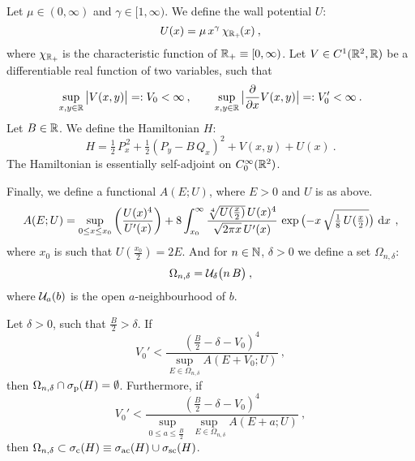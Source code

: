 \begin{defn}[Hamiltonian]
    Let $\mu \in (0, \infty)$ and $\gamma \in [1, \infty)$. We define the wall potential $U$:
    \begin{equation*}
        U(x) = \mu \, x^\gamma \, \chi_{\mathbb{R}_+\!}(x)
        \: ,
    \end{equation*}
    where $\chi_{\mathbb{R}_+\!}$ is the characteristic function of $\mathbb{R}_+ \equiv [0, \infty)$. Let $V \in C^1(\mathbb{R}^2, \mathbb{R})$ be a differentiable real function of two variables, such that
    \begin{equation*}
        \sup_{x,y \in \mathbb{R}} \big| V(x,y) \big| =: V_0 < \infty
        \: , \qquad
        \sup_{x,y \in \mathbb{R}} \big| \frac{\partial }{\partial x} V(x,y) \big| =: V_0' < \infty
        \: .
    \end{equation*}
    Let $B \in \mathbb{R}$. We define the Hamiltonian $H$:
    \begin{equation*}
        H
        = \tfrac{1}{2} \, P_x^{\,2}
        + \tfrac{1}{2}(P_y - B\, Q_x)^2
        + V(x, y)
        + U(x)
        \: .
    \end{equation*}
    The Hamiltonian is essentially self-adjoint on $C^\infty_0(\mathbb{R}^2)$.
\end{defn}
\begin{defn}[Auxiliary]
    Finally, we define a functional $A(E; U)$, where $E>0$ and $U$ is as above.
    \begin{equation*}
        A(E; U)
        = \sup_{0 \leq x \leq x_0}
        \left( \frac{U(x)^4}{U'(x)} \right)
        + 8 \int_{x_0}^\infty
        \frac{ \sqrt[4]{U(\tfrac{x}{2})} \, U(x)^4 }{ \sqrt{2\pi x} \, U'(x)}
        \, \exp \big( {-x} \, \sqrt{\tfrac{1}{8}\,U(\tfrac{x}{2})} \big)
        \, \, \mathrm{d}x \,
        \: ,
    \end{equation*}
    where $x_0$ is such that $U(\tfrac{x_0}{2}) = 2E$. And for $n \in \mathbb{N}$, $\delta>0$ we define a set $\Omega_{n,\delta}$:
    \begin{equation*}
        \Omega_{n, \delta} = \mathcal{U}_\delta\big( n \, B \big)
        \: ,
    \end{equation*}
    where $\mathcal{U}_a(b)$ is the open $a$-neighbourhood of $b$.
\end{defn}

\begin{thm}
    Let $\delta>0$, such that $\tfrac{B}{2} > \delta$. If
    \begin{equation*}
        V_0' < \frac{
            \left(\tfrac{B}{2} - \delta - V_0\right)^4
        }{
            \displaystyle \sup_{E \in \Omega_{n,\delta}}
            A(E+V_0; U)
        }
        \: ,
    \end{equation*}
    then $\Omega_{n,\delta} \cap \sigma_{\mathrm{p}}(H) = \emptyset$. Furthermore, if
    \begin{equation*}
        V_0' < \frac{
            \left(\tfrac{B}{2} - \delta - V_0\right)^4
        }{
            \displaystyle
            \sup_{0 \leq a \leq \tfrac{B}{2} \;}
            \sup_{\; E \in \Omega_{n,\delta}}
            A(E+a; U)
        }
        \: ,
    \end{equation*}
    then $\Omega_{n, \delta} \subset \sigma_{\mathrm{c}}(H) \equiv \sigma_{\mathrm{ac}}(H) \cup \sigma_{\mathrm{sc}}(H)$.
\end{thm}


